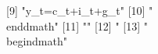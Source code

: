  [9] "{y_{t}}={c_{t}}+{i_{t}}+{g_{t}}"                                                                                                                                                                                                                                                                                                                                                                                                                                                                                                                                                                                                              
 [10] "\\end{dmath}"                                                                                                                                                                                                                                                                                                                                                                                                                                                                                                                                                                                                                                 
 [11] ""                                                                                                                                                                                                                                                                                                                                                                                                                                                                                                                                                                                                                                             
 [12] "%
 [13] "\\begin{dmath}"                                                                                                                                                                                                                                                                                                                                                                                                                                                                                                                                                                                                                               

